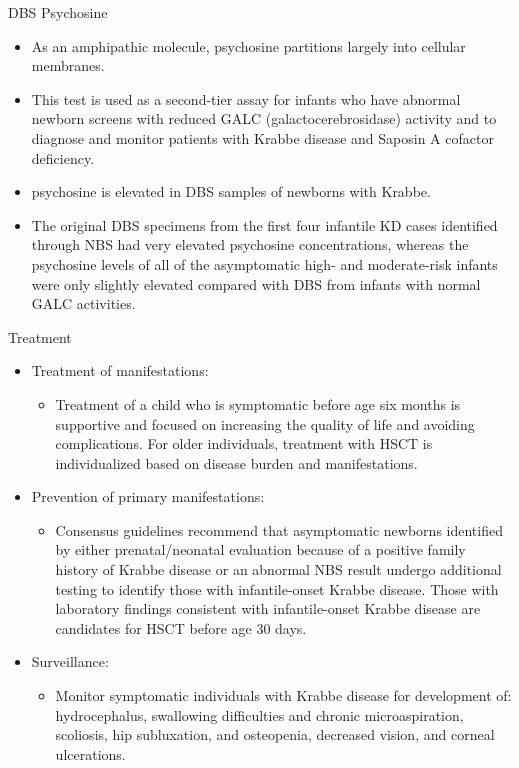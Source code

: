 \documentclass[presentation, smaller]{beamer}
\begin{document}
\begin{frame}[label={sec:org1458870}]{DBS Psychosine}
\begin{itemize}
\item As an amphipathic molecule, psychosine partitions largely into
cellular membranes.
\item This test is used as a second-tier assay for infants who have
abnormal newborn screens with reduced GALC (galactocerebrosidase)
activity and to diagnose and monitor patients with Krabbe disease
and Saposin A cofactor deficiency.

\item psychosine is elevated in DBS samples of newborns with Krabbe.

\item The original DBS specimens from the first four infantile
KD cases identified through NBS had very elevated psychosine
concentrations, whereas the psychosine levels of all of the
asymptomatic high- and moderate-risk infants were only slightly
elevated compared with DBS from infants with normal GALC activities.
\end{itemize}
\end{frame}


\begin{frame}[label={sec:org1e83bcd}]{Treatment}
\begin{itemize}
\item Treatment of manifestations:
\begin{itemize}
\item Treatment of a child who is symptomatic before age six months is
supportive and focused on increasing the quality of life and
avoiding complications. For older individuals, treatment with HSCT
is individualized based on disease burden and manifestations.
\end{itemize}

\item Prevention of primary manifestations:
\begin{itemize}
\item Consensus guidelines recommend that asymptomatic newborns
identified by either prenatal/neonatal evaluation because of a
positive family history of Krabbe disease or an abnormal NBS
result undergo additional testing to identify those with
infantile-onset Krabbe disease. Those with laboratory findings
consistent with infantile-onset Krabbe disease are candidates for
HSCT before age 30 days.
\end{itemize}

\item Surveillance:
\begin{itemize}
\item Monitor symptomatic individuals with Krabbe disease for
development of: hydrocephalus, swallowing difficulties and chronic
microaspiration, scoliosis, hip subluxation, and osteopenia,
decreased vision, and corneal ulcerations.
\end{itemize}
\end{itemize}
\end{frame}
\end{document}

